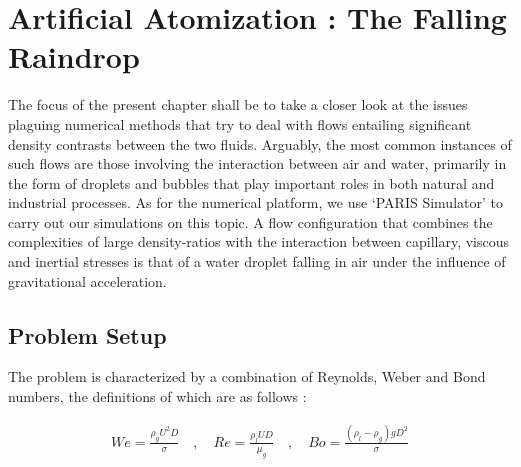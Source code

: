 \setchapterpreamble[u]{\margintoc}
\chapter{Artificial Atomization : The Falling Raindrop}

The focus of the present chapter shall be to take a closer look at the issues 
plaguing numerical methods that try to deal with flows 
entailing significant density contrasts between the two fluids. 
Arguably, the most common instances of such flows are those involving the interaction
between air and water, primarily in the form of droplets and 
bubbles that play important roles in both natural and industrial processes. 
As for the numerical platform, we use `PARIS Simulator' 
to carry out our simulations on this topic. 
A flow configuration that combines the complexities of large 
density-ratios with the interaction between capillary, viscous and 
inertial stresses is that of a water droplet falling in 
air under the influence of gravitational acceleration.

\section{Problem Setup}

The problem is characterized by a combination of Reynolds, 
Weber and Bond numbers, the definitions of which are as follows : 

\begin{align}
We=\frac{\rho_{g} U^2 D}{\sigma} \quad,\quad Re= \frac{\rho_{l} U D}{\mu_{g}} \quad,\quad Bo=\frac{\left(\rho_{l}-\rho_{g}\right) g D^2 }{\sigma}
\end{align}



